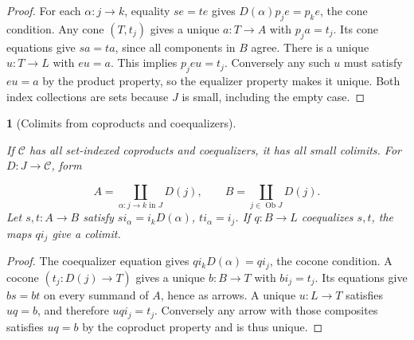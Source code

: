 \documentclass[11pt,a4paper]{article}
\newcommand{\mathheading}{}
\theoremstyle{plain}
\newtheorem*{plainstatement}{\mathheading}
\theoremstyle{definition}
\newenvironment{mathstatement}[3]{\renewcommand{\mathheading}{#1 #2}\begin{plainstatement}[#3]}{\end{plainstatement}}
\begin{document}
\begin{proof}

For each \(\alpha:j\to k\), equality \(se=te\) gives \(D(\alpha)p_je=p_ke\), the cone condition. Any cone \((T,t_j)\) gives a unique \(a:T\to A\) with \(p_ja=t_j\). Its cone equations give \(sa=ta\), since all components in \(B\) agree. There is a unique \(u:T\to L\) with \(eu=a\). This implies \(p_jeu=t_j\). Conversely any such \(u\) must satisfy \(eu=a\) by the product property, so the equalizer property makes it unique. Both index collections are sets because \(J\) is small, including the empty case.


\end{proof}
 
\begin{mathstatement}{Theorem}{2.10}{Colimits from coproducts and coequalizers}
\label{env-2-10}

If \(\mathcal C\) has all set-indexed coproducts and coequalizers, it has all small colimits. For \(D:J\to\mathcal C\), form

\[A=\coprod_{\alpha:j\to k\text{ in }J}D(j),\qquad B=\coprod_{j\in\operatorname{Ob}J}D(j).\] 
Let \(s,t:A\to B\) satisfy \(s i_\alpha=i_kD(\alpha)\), \(t i_\alpha=i_j\). If \(q:B\to L\) coequalizes \(s,t\), the maps \(q i_j\) give a colimit.


\par{}\par

\end{mathstatement}
 
\begin{proof}

The coequalizer equation gives \(q i_kD(\alpha)=q i_j\), the cocone condition. A cocone \((t_j:D(j)\to T)\) gives a unique \(b:B\to T\) with \(bi_j=t_j\). Its equations give \(bs=bt\) on every summand of \(A\), hence as arrows. A unique \(u:L\to T\) satisfies \(uq=b\), and therefore \(uq i_j=t_j\). Conversely any arrow with those composites satisfies \(uq=b\) by the coproduct property and is thus unique.


\end{proof}
 
\end{document}
